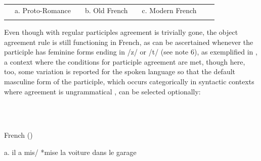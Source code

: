 \documentclass[output=paper]{langscibook}
\begin{document}
\begin{tabularx}{\textwidth}{XXXXXXXXXXX}

\lsptoprule
\multicolumn{1}{c}{(12)} & \multicolumn{1}{c}{a. Proto-Romance} &  & \multicolumn{2}{c}{b. Old French} &  & \multicolumn{3}{c}{c. Modern French} &  & \\
\lspbottomrule
\end{tabularx}
Even though with regular participles  agreement is trivially gone, the object agreement rule is still functioning in French, as can be ascertained whenever the participle has feminine forms ending in /z/ or /t/ (see note 6), as exemplified in , a context where the conditions for participle agreement are met, though here, too, some variation is reported for the spoken language so that the default masculine form of the participle, which occurs categorically in syntactic contexts where agreement is ungrammatical , can be selected optionally:

\begin{styleTabellaLUNGA}
\ea%
    \label{ex:key:13}
    \gll \\
         \\
    \glt
    \z %

          French (\citealt{GuastiRizzi2002})
\end{styleTabellaLUNGA}

\begin{styleTabellaLUNGA}
  a.  il  a     mis/  *mise  la     voiture  dans   le     garage    
\end{styleTabellaLUNGA}
\end{document}

